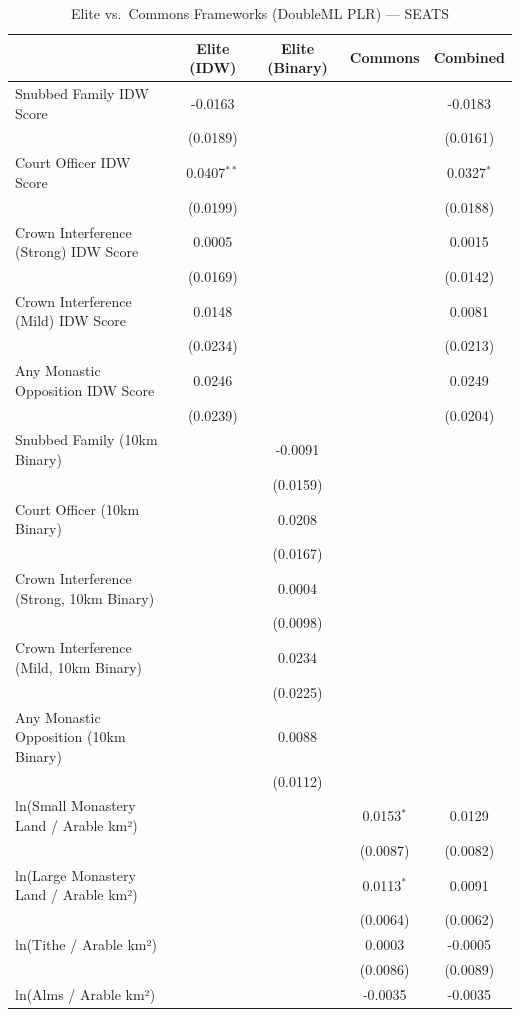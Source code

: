 \begin{table}[H]
\centering
\caption{Elite vs.\ Commons Frameworks (DoubleML PLR) --- SEATS}
\label{tab:aipw_seats}
\begin{tabular}{lcccc}
\hline\hline
 & Elite (IDW) & Elite (Binary) & Commons & Combined \\
\hline
Snubbed Family IDW Score & -0.0163 &  &  & -0.0183 \\
 & (0.0189) &  &  & (0.0161) \\
Court Officer IDW Score & 0.0407$^{**}$ &  &  & 0.0327$^{*}$ \\
 & (0.0199) &  &  & (0.0188) \\
Crown Interference (Strong) IDW Score & 0.0005 &  &  & 0.0015 \\
 & (0.0169) &  &  & (0.0142) \\
Crown Interference (Mild) IDW Score & 0.0148 &  &  & 0.0081 \\
 & (0.0234) &  &  & (0.0213) \\
Any Monastic Opposition IDW Score & 0.0246 &  &  & 0.0249 \\
 & (0.0239) &  &  & (0.0204) \\
Snubbed Family (10km Binary) &  & -0.0091 &  &  \\
 &  & (0.0159) &  &  \\
Court Officer (10km Binary) &  & 0.0208 &  &  \\
 &  & (0.0167) &  &  \\
Crown Interference (Strong, 10km Binary) &  & 0.0004 &  &  \\
 &  & (0.0098) &  &  \\
Crown Interference (Mild, 10km Binary) &  & 0.0234 &  &  \\
 &  & (0.0225) &  &  \\
Any Monastic Opposition (10km Binary) &  & 0.0088 &  &  \\
 &  & (0.0112) &  &  \\
ln(Small Monastery Land / Arable km²) &  &  & 0.0153$^{*}$ & 0.0129 \\
 &  &  & (0.0087) & (0.0082) \\
ln(Large Monastery Land / Arable km²) &  &  & 0.0113$^{*}$ & 0.0091 \\
 &  &  & (0.0064) & (0.0062) \\
ln(Tithe / Arable km²) &  &  & 0.0003 & -0.0005 \\
 &  &  & (0.0086) & (0.0089) \\
ln(Alms / Arable km²) &  &  & -0.0035 & -0.0035 \\

\end{tabular}
\end{table}
